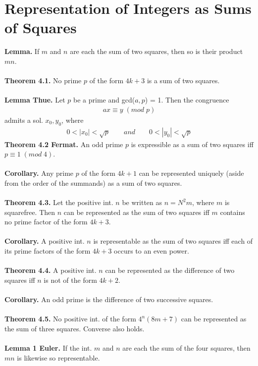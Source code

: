 \documentclass[a4paper,10pt]{article}
\begin{document}
\section{Representation of Integers as Sums of Squares}
\textbf{Lemma.} If $m$ and $n$ are each the sum of two squares, then so is their product $mn$. \\ \\
\textbf{Theorem 4.1.} No prime $p$ of the form $4k+3$ is a sum of two squares. \\ \\
\textbf{Lemma Thue.} Let $p$ be a prime and gcd($a,p$) = 1. Then the congruence 
\begin{align}
ax\equiv y \; (mod \; p)
\end{align}
admits a sol. $x_{0}, y_{0}$, where
\begin{align}
0<|x_{0}|<\sqrt{p} \quad \quad and \quad \quad 0<|y_{0}|<\sqrt{p}
\end{align}
\textbf{Theorem 4.2 Fermat.} An odd prime $p$ is expressible as a sum of two squares iff $p\equiv 1 \; (mod \; 4)$. \\ \\
\textbf{Corollary.} Any prime $p$ of the form $4k+1$ can be represented uniquely (aside from the order of the summands) as a sum of two squares. \\ \\
\textbf{Theorem 4.3.} Let the positive int. $n$ be written as $n = N^{2}m$, where $m$ is squarefree. Then $n$ can be represented as the sum of two squares iff $m$ contains no prime factor of the form $4k+3$. \\ \\
\textbf{Corollary.} A positive int. $n$ is representable as the sum of two squares iff each of its prime factors of the form $4k+3$ occurs to an even power. \\ \\
\newpage
\textbf{Theorem 4.4.} A positive int. $n$ can be represented as the difference of two squares iff $n$ is not of the form $4k+2$. \\ \\
\textbf{Corollary.} An odd prime is the difference of two successive squares. \\ \\
\textbf{Theorem 4.5.} No positive int. of the form $4^{n}(8m+7)$ can be represented as the sum of three squares. Converse also holds.\\ \\
\textbf{Lemma 1 Euler.} If the int. $m$ and $n$ are each the sum of the four squares, then $mn$ is likewise so representable. \\ \\
\end{document}
